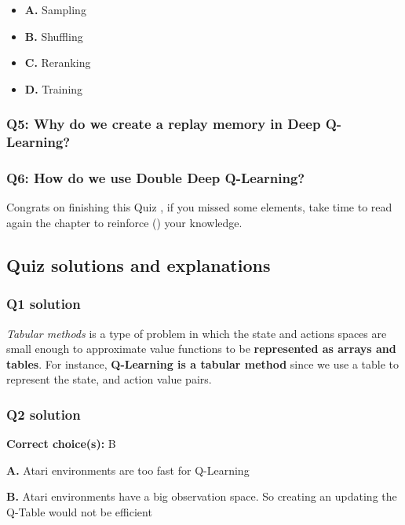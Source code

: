 \documentclass[11pt,a4paper]{article}
\begin{document}
\begin{itemize}
\tightlist
\item
  \textbf{A.} Sampling
\item
  \textbf{B.} Shuffling
\item
  \textbf{C.} Reranking
\item
  \textbf{D.} Training
\end{itemize}

\subsubsection{Q5: Why do we create a replay memory in Deep Q-Learning?}\label{q5-why-do-we-create-a-replay-memory-in-deep-q-learning}

\subsubsection{Q6: How do we use Double Deep Q-Learning?}\label{q6-how-do-we-use-double-deep-q-learning}

Congrats on finishing this Quiz , if you missed some elements, take time to read again the chapter to reinforce () your knowledge.

\subsection{Quiz solutions and explanations}\label{quiz-solutions-and-explanations}

\subsubsection{Q1 solution}\label{q1-solution}

\emph{Tabular methods} is a type of problem in which the state and actions spaces are small enough to approximate value functions to be \textbf{represented as arrays and tables}. For instance, \textbf{Q-Learning is a tabular method} since we use a table to represent the state, and action value pairs.

\subsubsection{Q2 solution}\label{q2-solution}

\textbf{Correct choice(s):} B

\textbf{A.} Atari environments are too fast for Q-Learning

\textbf{B.} Atari environments have a big observation space. So creating an updating the Q-Table would not be efficient
\end{document}
